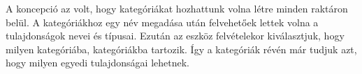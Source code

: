 A koncepció az volt, hogy kategóriákat hozhattunk volna létre minden raktáron belül.
A kategóriákhoz egy név megadása után felvehetőek lettek volna a tulajdonságok nevei és típusai.
Ezután az eszköz felvételekor kiválasztjuk, hogy milyen kategóriába, kategóriákba tartozik. 
Így a kategóriák révén már tudjuk azt, hogy milyen egyedi tulajdonságai lehetnek.
